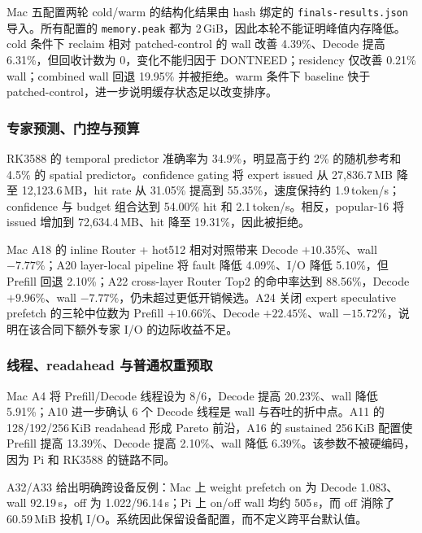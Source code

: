 Mac 五配置两轮 cold/warm 的结构化结果由 hash 绑定的 \texttt{finals-results.json} 导入。所有配置的 \texttt{memory.peak} 都为 2\,GiB，因此本轮不能证明峰值内存降低。cold 条件下 reclaim 相对 patched-control 的 wall 改善 4.39\%、Decode 提高 6.31\%，但回收计数为 0，变化不能归因于 DONTNEED；residency 仅改善 0.21\% wall；combined wall 回退 19.95\% 并被拒绝。warm 条件下 baseline 快于 patched-control，进一步说明缓存状态足以改变排序。

\FinalsResultsTable
\FinalsDecisionSummary

\FinalsMacIntervalFigure

\subsubsection{专家预测、门控与预算}

RK3588 的 temporal predictor 准确率为 34.9\%，明显高于约 2\% 的随机参考和 4.5\% 的 spatial predictor。confidence gating 将 expert issued 从 27,836.7\,MB 降至 12,123.6\,MB，hit rate 从 31.05\% 提高到 55.35\%，速度保持约 1.9\,token/s；confidence 与 budget 组合达到 54.00\% hit 和 2.1\,token/s。相反，popular-16 将 issued 增加到 72,634.4\,MB、hit 降至 19.31\%，因此被拒绝。

Mac A18 的 inline Router + hot512 相对对照带来 Decode $+10.35\%$、wall $-7.77\%$；A20 layer-local pipeline 将 fault 降低 4.09\%、I/O 降低 5.10\%，但 Prefill 回退 2.10\%；A22 cross-layer Router Top2 的命中率达到 88.56\%，Decode $+9.96\%$、wall $-7.77\%$，仍未超过更低开销候选。A24 关闭 expert speculative prefetch 的三轮中位数为 Prefill $+10.66\%$、Decode $+22.45\%$、wall $-15.72\%$，说明在该合同下额外专家 I/O 的边际收益不足。

\subsubsection{线程、readahead 与普通权重预取}

Mac A4 将 Prefill/Decode 线程设为 8/6，Decode 提高 20.23\%、wall 降低 5.91\%；A10 进一步确认 6 个 Decode 线程是 wall 与吞吐的折中点。A11 的 128/192/256\,KiB readahead 形成 Pareto 前沿，A16 的 sustained 256\,KiB 配置使 Prefill 提高 13.39\%、Decode 提高 2.10\%、wall 降低 6.39\%。该参数不被硬编码，因为 Pi 和 RK3588 的链路不同。

A32/A33 给出明确跨设备反例：Mac 上 weight prefetch on 为 Decode 1.083、wall 92.19\,s，off 为 1.022/96.14\,s；Pi 上 on/off wall 均约 505\,s，而 off 消除了 60.59\,MiB 投机 I/O。系统因此保留设备配置，而不定义跨平台默认值。

